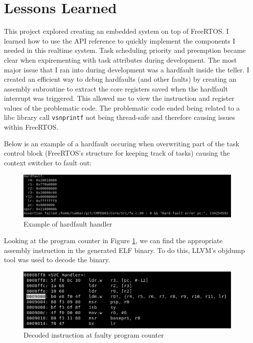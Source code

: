\documentclass[CMPE]{KGCOEReport}
\def\code#1{\texttt{#1}}
\begin{document}
    \section*{Lessons Learned}

	This project explored creating an embedded system on top of FreeRTOS. I learned
	how to use the API reference to quickly implement the components I needed in this
	realtime system. Task scheduling priority and preemption became clear when
	expirementing with task attributes during development. The most major issue that
	I ran into during development was a hardfault inside the teller. I created an
	efficient way to debug hardfaults (and other faults) by creating an assembly
	subroutine to extract the core registers saved when the hardfault interrupt was
	triggered. This allowed me to view the instruction and register values of the
	problematic code. The problematic code ended being related to a libc library call
	\code{vsnprintf} not being thread-safe and therefore causing issues within FreeRTOS.

	\pagebreak

	Below is an example of a hardfault occuring when overwriting part of the task
	control block (FreeRTOS's structure for keeping track of tasks) causing the
	context switcher to fault out:

	\begin{figure}[h!]
      \centering
      \includegraphics[width=5.5in]{hardfault}
      \caption{Example of hardfault handler}
      \label{fig:fault}
    \end{figure}

	Looking at the program counter in Figure \ref{fig:fault}, we can find the appropriate
	assembly instruction in the generated ELF binary. To do this, LLVM's objdump tool
	was used to decode the binary.

	\begin{figure}[h!]
      \centering
      \includegraphics[width=5.5in]{fault_pc}
      \caption{Decoded instruction at faulty program counter}
      \label{fig:fault_pc}
    \end{figure}
\end{document}
